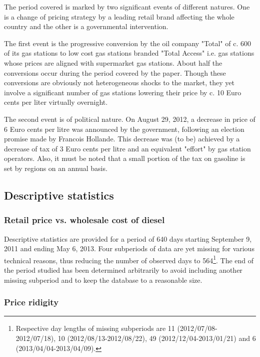 \documentclass[english]{article}
\begin{document}
The period covered is marked by two significant events of different natures. One is a change of pricing strategy by a leading retail brand affecting the whole country and the other is a governmental intervention.

The first event is the progressive conversion by the oil company "Total" of c. 600 of its gas stations to low cost gas stations branded "Total Access" i.e. gas stations whose prices are aligned with supermarket gas stations. About half the conversions occur during the period covered by the paper. Though these conversions are obviously not heterogeneous shocks to the market, they yet involve a significant number of gas stations lowering their price by c. 10 Euro cents per liter virtually overnight.

The second event is of political nature. On August 29, 2012, a decrease in price of 6 Euro cents per litre was announced by the government, following an election promise made by Francois Hollande. This decrease was (to be) achieved by a decrease of tax of 3 Euro cents per litre and an equivalent "effort" by gas station operators. Also, it must be noted that a small portion of the tax on gasoline is set by regions on an annual basis.

\subsection{Descriptive statistics}

\subsubsection{Retail price vs. wholesale cost of diesel}

Descriptive statistics are provided for a period of 640 days starting September 9, 2011 and ending May 6, 2013. Four subperiods of data are yet missing for various technical reasons, thus reducing the number of observed days to 564\footnote{Respective day lengths of missing subperiods are 11 (2012/07/08-2012/07/18), 10 (2012/08/13-2012/08/22), 49 (2012/12/04-2013/01/21) and 6 (2013/04/04-2013/04/09).}. The end of the period studied has been determined arbitrarily to avoid including another missing subperiod and to keep the database to a reasonable size.

\subsubsection{Price ridigity}
\end{document}
